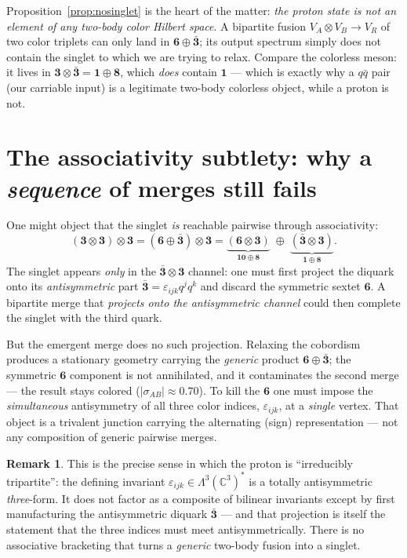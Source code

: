 \documentclass[11pt]{article}
\theoremstyle{definition}
\newtheorem{remark}{Remark}
\newcommand{\C}{\mathbb{C}}
\newcommand{\rep}[1]{\mathbf{#1}}      %
\newcommand{\triv}{\mathbf{1}}         %
\newcommand{\sigmacol}{\sigma}         %
\begin{document}
Proposition~\ref{prop:nosinglet} is the heart of the matter: \emph{the proton
state is not an element of any two-body color Hilbert space}. A bipartite fusion
$V_A\otimes V_B\to V_R$ of two color triplets can only land in
$\rep 6\oplus\bar{\rep 3}$; its output spectrum simply does not contain the
singlet to which we are trying to relax. Compare the colorless meson: it lives in
$\rep 3\otimes\bar{\rep 3}=\triv\oplus\rep 8$, which \emph{does} contain
$\triv$ --- which is exactly why a $q\bar q$ pair (our carriable input) is a
legitimate two-body colorless object, while a proton is not.

\section{The associativity subtlety: why a \emph{sequence} of merges still fails}

One might object that the singlet \emph{is} reachable pairwise through
associativity:
\[
  (\rep 3\otimes\rep 3)\otimes\rep 3
  =(\rep 6\oplus\bar{\rep 3})\otimes\rep 3
  =\underbrace{(\rep 6\otimes\rep 3)}_{\rep{10}\oplus\rep 8}
   \;\oplus\;
   \underbrace{(\bar{\rep 3}\otimes\rep 3)}_{\triv\oplus\rep 8}.
\]
The singlet appears \emph{only} in the $\bar{\rep 3}\otimes\rep 3$ channel: one
must first project the diquark onto its \emph{antisymmetric} part
$\bar{\rep 3}=\varepsilon_{ijk}q^j q^k$ and discard the symmetric sextet
$\rep 6$. A bipartite merge that \emph{projects onto the antisymmetric channel}
could then complete the singlet with the third quark.

But the emergent merge does no such projection. Relaxing the cobordism produces a
stationary geometry carrying the \emph{generic} product $\rep 6\oplus\bar{\rep 3}$;
the symmetric $\rep 6$ component is not annihilated, and it contaminates the
second merge --- the result stays colored ($|\sigmacol_{AB}|\approx0.70$). To
kill the $\rep 6$ one must impose the \emph{simultaneous} antisymmetry of all
three color indices, $\varepsilon_{ijk}$, at a \emph{single} vertex. That object
is a trivalent junction carrying the alternating (sign) representation --- not any
composition of generic pairwise merges.

\begin{remark}
This is the precise sense in which the proton is ``irreducibly tripartite'': the
defining invariant $\varepsilon_{ijk}\in\Lambda^3(\C^3)^*$ is a totally
antisymmetric \emph{three}-form. It does not factor as a composite of bilinear
invariants except by first manufacturing the antisymmetric diquark $\bar{\rep 3}$
--- and that projection is itself the statement that the three indices must meet
antisymmetrically. There is no associative bracketing that turns a \emph{generic}
two-body fusion into a singlet.
\end{remark}
\end{document}
